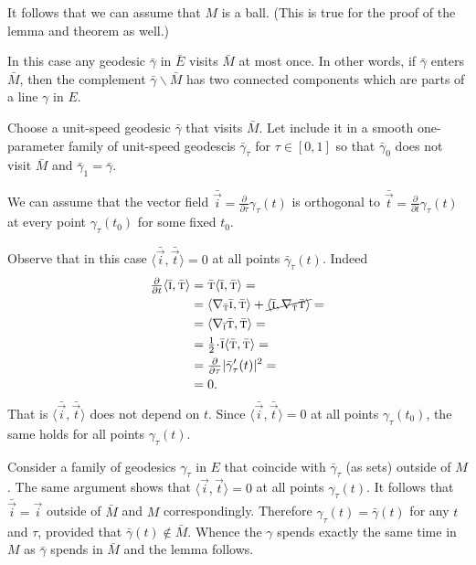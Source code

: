It follows that we can assume that $M$ is a ball.
(This is true for the proof of the lemma and theorem as well.)

In this case any geodesic $\bar\gamma$ in $\bar E$ visits $\bar M$ at most once.
In other words, if $\bar\gamma$ enters $\bar M$, then the complement $\bar\gamma\backslash \bar M$ has two connected components which are parts of a line $\gamma$ in $E$.

Choose a unit-speed geodesic $\bar\gamma$ that visits $\bar M$.
Let include it in a smooth one-parameter family of unit-speed geodescis $\bar\gamma_\tau$ for $\tau\in [0,1]$ so that $\bar\gamma_0$ does not visit $\bar M$ and $\bar \gamma_1=\bar \gamma$.

We can assume that 
the vector field $\bar{\vec i}
=\tfrac{\partial}{\partial\tau}\gamma_\tau(t)$ is orthogonal to $\bar{\vec t}
=\tfrac{\partial}{\partial t}\gamma_\tau(t)$ at every point $\gamma_\tau(t_0)$ for some fixed $t_0$.

Observe that in this case $\langle\bar{\vec i},\bar{\vec t}\rangle=0$ at all points $\bar\gamma_\tau(t)$.
Indeed 
\begin{align*}
\tfrac{\partial}{\partial t}\langle\bar{\vec i},\bar{\vec t}\rangle&=
\bar{\vec t}\langle\bar{\vec i},\bar{\vec t}\rangle=
\\
&=
\langle\nabla_{\bar{\vec t}}\bar{\vec i},\bar{\vec t}\rangle+\cancel{\langle\bar{\vec i},\nabla_{\bar{\vec t}}\bar{\vec t}\rangle}=
\\
&=\langle\nabla_{\bar{\vec i}}\bar{\vec t},\bar{\vec t}\rangle=
\\
&=\tfrac12\cdot\bar{\vec i}\langle\bar{\vec t},\bar{\vec t}\rangle=
\\
&=\tfrac{\partial}{\partial \tau}|\bar\gamma_\tau'(t)|^2=
\\
&=0.
\end{align*}
That is $\langle\bar{\vec i},\bar{\vec t}\rangle$ does not depend on $t$.
Since $\langle\bar{\vec i},\bar{\vec t}\rangle=0$ at all points $\gamma_\tau(t_0)$, the same holds for all points  $\gamma_\tau(t)$.

Consider a family of geodesics $\gamma_\tau$ in $E$ that coincide with $\bar\gamma_\tau$ (as sets) outside of $M$.
The same argument shows that $\langle\vec i,\vec t\rangle=0$ at all points $\gamma_\tau(t)$.
It follows that $\bar{\vec i}=\vec i$ outside of $\bar M$ and $M$ correspondingly.
Therefore $\gamma_\tau(t)=\bar\gamma(t)$ for any $t$ and $\tau$, provided that $\bar\gamma(t)\notin \bar M$.
Whence the $\gamma$ spends exactly the same time in $M$ as 
$\bar \gamma$ spends in $\bar M$ and the lemma follows.\qeds

